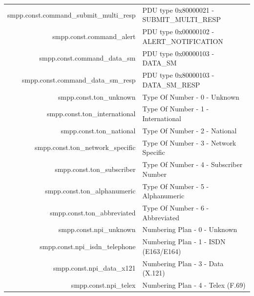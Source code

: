 \documentclass[a4paper,latin]{paper}
\begin{document}
\begin{tabularx}{\linewidth}{ | >{\ttfamily} r | >{\ttfamily} X |}
	smpp.const.command\_submit\_multi\_resp		& PDU type 0x80000021 - SUBMIT\_MULTI\_RESP\\
	smpp.const.command\_alert			& PDU type 0x00000102 - ALERT\_NOTIFICATION\\
	smpp.const.command\_data\_sm			& PDU type 0x00000103 - DATA\_SM\\
	smpp.const.command\_data\_sm\_resp		& PDU type 0x80000103 - DATA\_SM\_RESP\\
	smpp.const.ton\_unknown				& Type Of Number - 0 - Unknown\\
	smpp.const.ton\_international			& Type Of Number - 1 - International\\
	smpp.const.ton\_national			& Type Of Number - 2 - National\\
	smpp.const.ton\_network\_specific		& Type Of Number - 3 - Network Specific\\
	smpp.const.ton\_subscriber			& Type Of Number - 4 - Subscriber Number\\
	smpp.const.ton\_alphanumeric			& Type Of Number - 5 - Alphanumeric\\
	smpp.const.ton\_abbreviated			& Type Of Number - 6 - Abbreviated\\
	smpp.const.npi\_unknown				& Numbering Plan - 0 - Unknown\\
	smpp.const.npi\_isdn\_telephone			& Numbering Plan - 1 - ISDN (E163/E164)\\
	smpp.const.npi\_data\_x121			& Numbering Plan - 3 - Data (X.121)\\
	smpp.const.npi\_telex				& Numbering Plan - 4 - Telex (F.69)\\
	\hline
\end{tabularx}%
\clearpage
\end{document}
